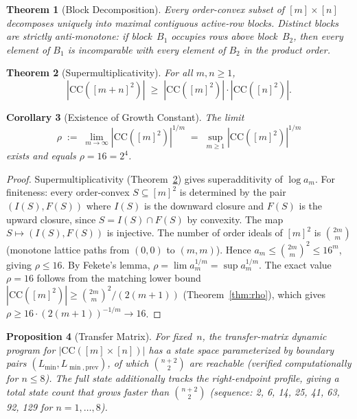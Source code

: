 \documentclass[11pt,a4paper]{article}
\theoremstyle{plain}
\newtheorem{theorem}{Theorem}[section]
\newtheorem{proposition}[theorem]{Proposition}
\newtheorem{corollary}[theorem]{Corollary}
\theoremstyle{definition}
\theoremstyle{remark}
\newcommand{\CC}{\mathrm{CC}}
\begin{document}
\begin{theorem}[Block Decomposition]\label{thm:decomposition}
Every order-convex subset of\/ $[m] \times [n]$ decomposes uniquely into maximal contiguous active-row blocks.
Distinct blocks are strictly anti-monotone: if block~$B_1$ occupies rows above block~$B_2$, then every element of\/ $B_1$ is incomparable with every element of\/ $B_2$ in the product order.
\end{theorem}

\begin{theorem}[Supermultiplicativity]\label{thm:supermult}
For all $m, n \geq 1$,
\[
|\CC([m+n]^2)| \;\geq\; |\CC([m]^2)| \cdot |\CC([n]^2)|.
\]
\end{theorem}

\begin{corollary}[Existence of Growth Constant]\label{cor:fekete}
The limit
\[
\rho \;:=\; \lim_{m \to \infty} |\CC([m]^2)|^{1/m} \;=\; \sup_{m \geq 1} |\CC([m]^2)|^{1/m}
\]
exists and equals $\rho = 16 = 2^4$.
\end{corollary}

\begin{proof}
Supermultiplicativity (Theorem~\ref{thm:supermult}) gives superadditivity of $\log a_m$.
For finiteness: every order-convex $S \subseteq [m]^2$ is determined by the pair $(I(S), F(S))$ where $I(S)$ is the downward closure and $F(S)$ is the upward closure, since $S = I(S) \cap F(S)$ by convexity.
The map $S \mapsto (I(S), F(S))$ is injective.
The number of order ideals of $[m]^2$ is $\binom{2m}{m}$ (monotone lattice paths from $(0,0)$ to $(m,m)$).
Hence $a_m \leq \binom{2m}{m}^2 \leq 16^m$, giving $\rho \leq 16$.
By Fekete's lemma, $\rho = \lim a_m^{1/m} = \sup a_m^{1/m}$.
The exact value $\rho = 16$ follows from the matching lower bound
$|\CC([m]^2)| \geq \binom{2m}{m}^2/(2(m{+}1))$ (Theorem~\ref{thm:rho}),
which gives $\rho \geq 16 \cdot (2(m{+}1))^{-1/m} \to 16$.
\end{proof}

\begin{proposition}[Transfer Matrix]\label{thm:transfer}
For fixed~$n$, the transfer-matrix dynamic program for $|\CC([m] \times [n])|$ has a state space parameterized by boundary pairs $(L_{\min}, L_{\min,\mathrm{prev}})$, of which $\binom{n+2}{2}$ are reachable (verified computationally for $n \leq 8$).
The full state additionally tracks the right-endpoint profile, giving a total state count that grows faster than $\binom{n+2}{2}$ (sequence: 2, 6, 14, 25, 41, 63, 92, 129 for $n = 1, \ldots, 8$).
\end{proposition}
\end{document}
